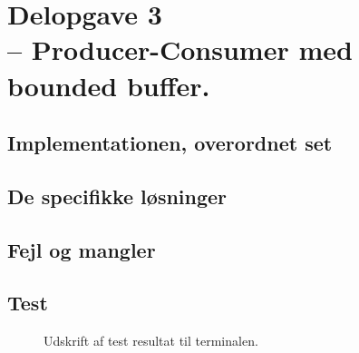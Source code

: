 \documentclass[main.tex]{subfile}
\begin{document}
\section{Delopgave 3\\\normalsize{-- Producer-Consumer med bounded buffer.}}

\subsection{Implementationen, overordnet set}

\subsection{De specifikke løsninger}

\subsection{Fejl og mangler}

\subsection{Test}

\begin{figure}[H]
\center
{}
\caption{Udskrift af test resultat til terminalen.}
\label{fig:opg2_2_test}
\end{figure}
\end{document}
